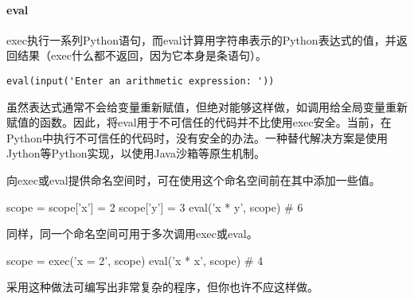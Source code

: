 \paragraph{eval} exec执行一系列Python语句，而eval计算用字符串表示的Python表达式的值，并返回结果（exec什么都不返回，因为它本身是条语句）。

\verb|eval(input('Enter an arithmetic expression: '))|
\begin{tcolorbox}
虽然表达式通常不会给变量重新赋值，但绝对能够这样做，如调用给全局变量重新赋值的函数。因此，将eval用于不可信任的代码并不比使用exec安全。当前，在Python中执行不可信任的代码时，没有安全的办法。一种替代解决方案是使用Jython等Python实现，以使用Java沙箱等原生机制。
\end{tcolorbox}

\begin{tcolorbox}[title=浅谈作用域, breakable]
向exec或eval提供命名空间时，可在使用这个命名空间前在其中添加一些值。
\begin{pyc}
    scope = {}
    scope['x'] = 2
    scope['y'] = 3
    eval('x * y', scope)  # 6
\end{pyc}
同样，同一个命名空间可用于多次调用exec或eval。
\begin{pyc}
scope = {}
exec('x = 2', scope)
eval('x * x', scope)  # 4
\end{pyc}
采用这种做法可编写出非常复杂的程序，但你也许不应这样做。
\end{tcolorbox}
